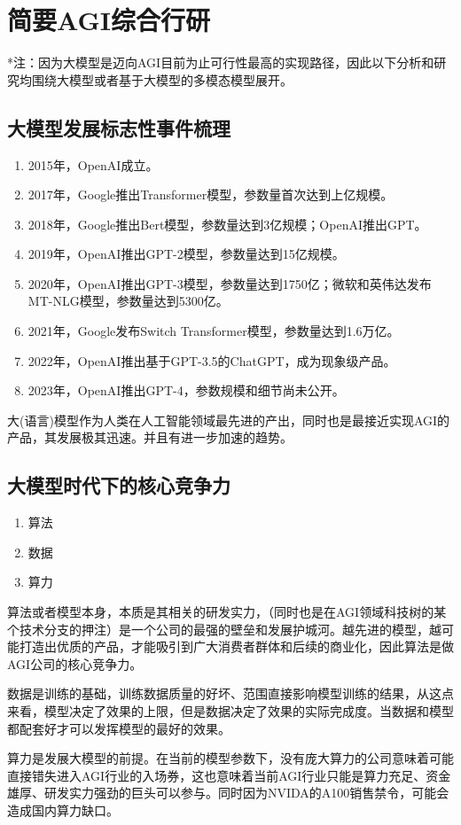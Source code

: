 \section{简要AGI综合行研}
*注：因为大模型是迈向AGI目前为止可行性最高的实现路径，因此以下分析和研究均围绕大模型或者基于大模型的多模态模型展开。
\subsection{大模型发展标志性事件梳理}
\begin{enumerate}
    \item 2015年，OpenAI成立。
    \item 2017年，Google推出Transformer模型，参数量首次达到上亿规模。
    \item 2018年，Google推出Bert模型，参数量达到3亿规模；OpenAI推出GPT。
    \item 2019年，OpenAI推出GPT-2模型，参数量达到15亿规模。
    \item 2020年，OpenAI推出GPT-3模型，参数量达到1750亿；微软和英伟达发布MT-NLG模型，参数量达到5300亿。
    \item 2021年，Google发布Switch Transformer模型，参数量达到1.6万亿。
    \item 2022年，OpenAI推出基于GPT-3.5的ChatGPT，成为现象级产品。
    \item 2023年，OpenAI推出GPT-4，参数规模和细节尚未公开。
\end{enumerate}
大(语言)模型作为人类在人工智能领域最先进的产出，同时也是最接近实现AGI的产品，其发展极其迅速。并且有进一步加速的趋势。
\subsection{大模型时代下的核心竞争力}
\begin{enumerate}
    \item 算法
    \item 数据
    \item 算力
\end{enumerate}
算法或者模型本身，本质是其相关的研发实力，（同时也是在AGI领域科技树的某个技术分支的押注）是一个公司的最强的壁垒和发展护城河。越先进的模型，越可能打造出优质的产品，才能吸引到广大消费者群体和后续的商业化，因此算法是做AGI公司的核心竞争力。

数据是训练的基础，训练数据质量的好坏、范围直接影响模型训练的结果，从这点来看，模型决定了效果的上限，但是数据决定了效果的实际完成度。当数据和模型都配套好才可以发挥模型的最好的效果。

算力是发展大模型的前提。在当前的模型参数下，没有庞大算力的公司意味着可能直接错失进入AGI行业的入场券，这也意味着当前AGI行业只能是算力充足、资金雄厚、研发实力强劲的巨头可以参与。同时因为NVIDA的A100销售禁令，可能会造成国内算力缺口。

